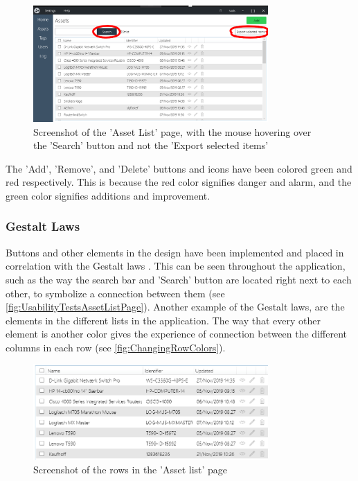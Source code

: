 \begin{figure}[H]
    \centering
    \includegraphics[width=0.8\textwidth]{figures/UIDesignElements/ButtonColors_AssetList.png}
    \caption{Screenshot of the 'Asset List' page, with the mouse hovering over the 'Search' button and not the 'Export selected items'}
    \label{fig:HoverColorAndBorderedButtons}
\end{figure}

The 'Add', 'Remove', and 'Delete' buttons and icons have been colored green and red respectively. This is because the red color signifies danger and alarm, and the green color signifies additions and improvement.

\subsubsection*{Gestalt Laws}
Buttons and other elements in the design have been implemented and placed in correlation with the Gestalt laws \citep{GestaltLaws}. This can be seen throughout the application, such as the way the search bar and 'Search' button are located right next to each other, to symbolize a connection between them (see \autoref{fig:UsabilityTestsAssetListPage}). Another example of the Gestalt laws, are the elements in the different lists in the application. The way that every other element is another color gives the experience of connection between the different columns in each row (see \autoref{fig:ChangingRowColors}).

\begin{figure}[H]
    \centering
    \includegraphics[width=0.8\textwidth]{figures/UIDesignElements/DifferentColoredRows.png}
    \caption{Screenshot of the rows in the 'Asset list' page}
    \label{fig:ChangingRowColors}
\end{figure}

